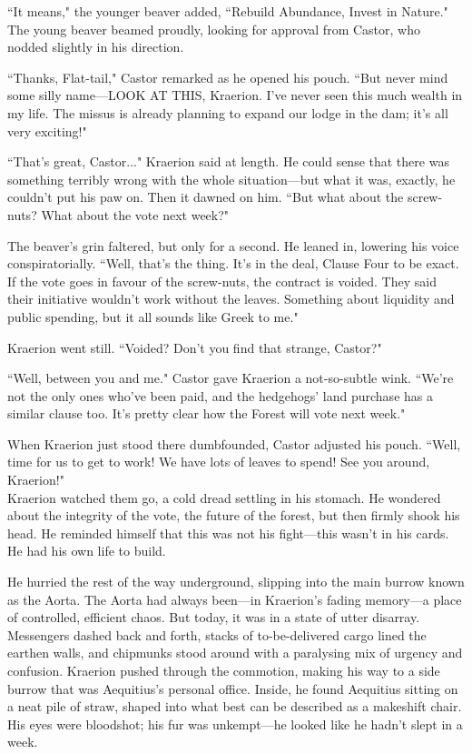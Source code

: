 ``It means," the younger beaver added,
``Rebuild Abundance, Invest in Nature." The young beaver beamed proudly, looking for approval from Castor, who nodded slightly in his direction.

``Thanks, Flat-tail," Castor remarked as he opened his pouch.
``But never mind some silly name---LOOK AT THIS, Kraerion.
I've never seen this much wealth in my life.
The missus is already planning to expand our lodge in the dam; it's all very exciting!"

``That's great, Castor..." Kraerion said at length.
He could sense that there was something terribly wrong with the whole situation---but what it was, exactly, he couldn't put his paw on.
Then it dawned on him.
``But what about the screw-nuts?
What about the vote next week?"

The beaver's grin faltered, but only for a second.
He leaned in, lowering his voice conspiratorially. ``Well, that's the thing.
It's in the deal, Clause Four to be exact.
If the vote goes in favour of the screw-nuts, the contract is voided.
They said their initiative wouldn't work without the leaves.
Something about liquidity and public spending, but it all sounds like Greek to me."

Kraerion went still. ``Voided?
Don't you find that strange, Castor?"

``Well, between you and me." Castor gave Kraerion a not-so-subtle wink.
``We're not the only ones who've been paid, and the hedgehogs' land purchase has a similar clause too.
It's pretty clear how the Forest will vote next week."

When Kraerion just stood there dumbfounded, Castor adjusted his pouch.
``Well, time for us to get to work!
We have lots of leaves to spend!
See you around, Kraerion!"\\

Kraerion watched them go, a cold dread settling in his stomach.
He wondered about the integrity of the vote, the future of the forest, but then firmly shook his head.
He reminded himself that this was not his fight---this wasn't in his cards.
He had his own life to build.

He hurried the rest of the way underground, slipping into the main burrow known as the Aorta.
The Aorta had always been---in Kraerion's fading memory---a place of controlled, efficient chaos.
But today, it was in a state of utter disarray.
Messengers dashed back and forth, stacks of to-be-delivered cargo lined the earthen walls, and chipmunks stood around with a paralysing mix of urgency and confusion.
Kraerion pushed through the commotion, making his way to a side burrow that was Aequitius's personal office.
Inside, he found Aequitius sitting on a neat pile of straw, shaped into what best can be described as a makeshift chair.
His eyes were bloodshot; his fur was unkempt---he looked like he hadn't slept in a week.

